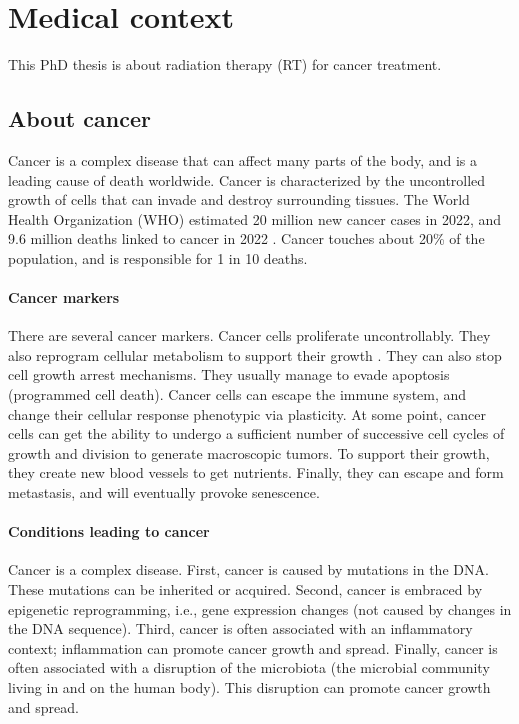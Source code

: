 \section{Medical context}
This PhD thesis is about radiation therapy (RT) for cancer treatment.

\subsection{About cancer}
Cancer is a complex disease that can affect many parts of the body, and is a leading cause of death worldwide.
Cancer is characterized by the uncontrolled growth of cells that can invade and destroy surrounding tissues.
The World Health Organization (WHO) estimated 20 million new cancer cases in 2022, and 9.6 million deaths linked to cancer in 2022 \cite{who_cancer2022}.
Cancer touches about 20\% of the population, and is responsible for 1 in 10 deaths.

\paragraph{Cancer markers}
There are several cancer markers.
Cancer cells proliferate uncontrollably.
They also reprogram cellular metabolism to support their growth \cite{Chammas2013}.
They can also stop cell growth arrest mechanisms.
They usually manage to evade apoptosis (programmed cell death).
Cancer cells can escape the immune system, and change their cellular response phenotypic via plasticity.
At some point, cancer cells can get the ability to undergo a sufficient number of successive cell cycles of growth and division to generate macroscopic tumors.
To support their growth, they create new blood vessels to get nutrients.
Finally, they can escape and form metastasis, and will eventually provoke senescence.

\paragraph{Conditions leading to cancer}
Cancer is a complex disease.
First, cancer is caused by mutations in the DNA.
These mutations can be inherited or acquired.
Second, cancer is embraced by epigenetic reprogramming, i.e., gene expression changes (not caused by changes in the DNA sequence).
Third, cancer is often associated with an inflammatory context; inflammation can promote cancer growth and spread.
Finally, cancer is often associated with a disruption of the microbiota (the microbial community living in and on the human body).
This disruption can promote cancer growth and spread.

